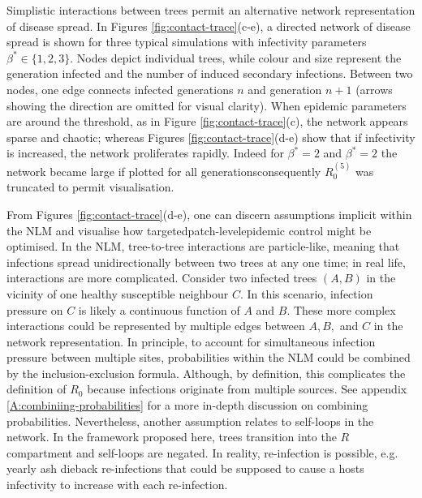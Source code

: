 Simplistic interactions between trees permit an alternative network representation of disease spread.
In Figures \ref{fig:contact-trace}(c-e), a directed network of disease spread is shown for three typical simulations with infectivity parameters $\beta^* \in \lbrace 1, 2, 3 \rbrace$.
Nodes depict individual trees, while colour and size represent the generation infected and the number of induced secondary infections.
Between two nodes, one edge connects infected generations $n$  and generation $n+1$ (arrows showing the direction are omitted for visual clarity). 
When epidemic parameters are around the threshold, as in Figure \ref{fig:contact-trace}(c), the network appears sparse and chaotic;
whereas Figures \ref{fig:contact-trace}(d-e) show that if infectivity is increased, the network proliferates rapidly. 
Indeed for $\beta^*=2$ and $\beta^*=2$ the network became large if plotted for all generations\textemdash consequently $R_0^{(5)}$ was truncated to permit visualisation.

From Figures \ref{fig:contact-trace}(d-e), one can discern assumptions implicit within the NLM and visualise how targeted\textemdash patch-level\textemdash epidemic control might be optimised.
In the NLM, tree-to-tree interactions are particle-like, meaning that infections spread unidirectionally between two trees at any one time;
in real life, interactions are more complicated.
Consider two infected trees $(A, B)$ in the vicinity of one healthy susceptible neighbour $C$. In this scenario, infection pressure on $C$ is likely a continuous function of $A$ and $B$.
These more complex interactions could be represented by multiple edges between $A, B,$ and $C$ in the network representation.
In principle, to account for simultaneous infection pressure between multiple sites, probabilities within the NLM could be combined by the inclusion-exclusion formula.
Although, by definition, this complicates the definition of $R_0$ because infections originate from multiple sources.
See appendix \ref{A:combiniing-probabilities} for a more in-depth discussion on combining probabilities.
Nevertheless, another assumption relates to self-loops in the network.
In the framework proposed here, trees transition into the $R$ compartment and self-loops are negated.
In reality, re-infection is possible\textemdash, e.g. yearly ash dieback re-infections \cite{gross2014h}\textemdash that could be supposed to cause a hosts infectivity to increase with each re-infection.

